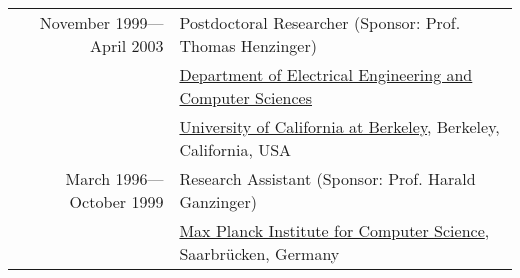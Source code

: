 \begin{tabular}{rl}
\noalign{\smallskip}
November 1999---April 2003 & Postdoctoral Researcher (Sponsor: Prof. Thomas Henzinger)\\
                           & \href{http://www.eecs.berkeley.edu}{Department of Electrical Engineering and Computer Sciences} \\
                           & \href{http://www.berkeley.edu}{University of California at Berkeley}, Berkeley, California, USA \\
\noalign{\smallskip}
March 1996---October 1999 & Research Assistant (Sponsor: Prof. Harald Ganzinger)\\
                          & \href{http://www.mpi-sb.mpg.de}{Max Planck Institute for Computer Science}, Saarbr{\"u}cken, Germany \\
\end{tabular}

\newpage
